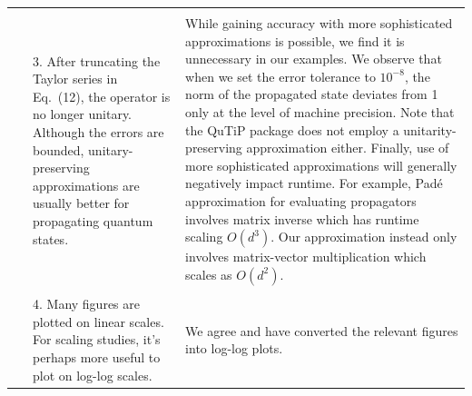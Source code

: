 \documentclass{article}
\begin{document}
\begin{center}
\begin{longtable}{cp{5.50cm}p{11.5cm}}
\\
\multicolumn{3}{l}{}  \\
~ & {\color{grey}
3. After truncating the Taylor series in Eq.\ (12), the operator is no longer unitary. Although the errors are bounded, unitary-preserving approximations are usually better for propagating quantum states. }
&
While gaining accuracy with more sophisticated approximations is possible, we find it is unnecessary in our examples. We observe that when we set the error tolerance to $10^{-8}$, the norm of the propagated state deviates from 1 only at the level of machine precision. Note that the QuTiP package does not employ a unitarity-preserving approximation either. Finally, use of more sophisticated approximations will generally negatively impact runtime. For example, Pad\'e approximation for evaluating propagators involves matrix inverse which has runtime scaling $O(d^3)$. Our approximation instead only involves matrix-vector multiplication which scales as $O(d^2)$.





\\
\multicolumn{3}{l}{}  \\
~ & {\color{grey}
4. Many figures are plotted on linear scales. For scaling studies, it’s perhaps more useful to plot on log-log scales.}
&
We agree and have converted the relevant figures into log-log plots.


\end{longtable}
\end{center}
\end{document}
